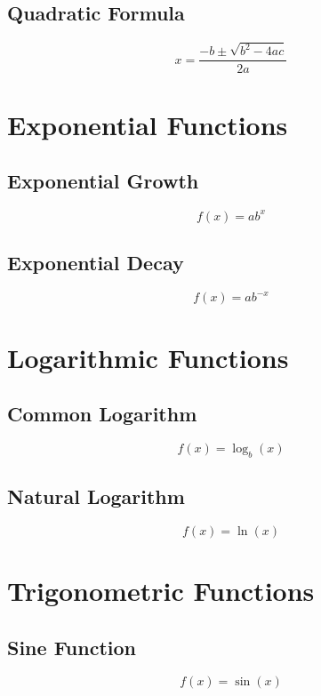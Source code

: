 \subsection{Quadratic Formula}
\begin{equation}
	x = \frac{-b \pm \sqrt{b^2 - 4ac}}{2a}
\end{equation}

\section{Exponential Functions}
\subsection{Exponential Growth}
\begin{equation}
    f(x) = ab^x
\end{equation}

\subsection{Exponential Decay}
\begin{equation}
    f(x) = ab^{-x}
\end{equation}

\section{Logarithmic Functions}
\subsection{Common Logarithm}
\begin{equation}
    f(x) = \log_b(x)
\end{equation}

\subsection{Natural Logarithm}
\begin{equation}
    f(x) = \ln(x)
\end{equation}

\section{Trigonometric Functions}
\subsection{Sine Function}
\begin{equation}
    f(x) = \sin(x)
\end{equation}

